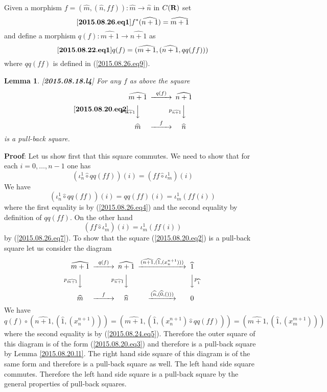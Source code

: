 \documentclass[11pt]{article}
\newenvironment{eq}{\begin{equation}}{\end{equation}}
\newenvironment{proof}{{\bf Proof}:}{\vskip 5mm }
\newtheorem{lemma}[proposition]{Lemma}
\newcommand{\llabel}[1]{\label{#1}[{\bf #1}]}
\newcommand{\sr}{\rightarrow}
\newcommand{\rr}{{\bf R}}
\newcommand{\wh}{\widehat}
\newcommand{\hc}{\wh{\circ}}
\begin{document}
%
Given a morphism $f=(\wh{m},(\wh{n},ff)):\wh{m}\sr \wh{n}$ in $C(\rr)$ set
%
\begin{eq}
\llabel{2015.08.26.eq1}
f^*(\wh{n+1})=\wh{m+1}
\end{eq}
%
and define a morphism $q(f):\wh{m+1}\sr \wh{n+1}$ as  
%
\begin{eq}
\llabel{2015.08.22.eq1}
q(f)=(\wh{m+1},(\wh{n+1},qq(ff)))
\end{eq}
% 
where $qq(ff)$ is defined in (\ref{2015.08.26.eq9}).
%
\begin{lemma}
\llabel{2015.08.18.l4}
For any $f$ as above the square
%
\begin{eq}\llabel{2015.08.20.eq2}
\begin{CD}
\wh{m+1} @>q(f)>> \wh{n+1}\\
@Vp_{\wh{m+1}}VV @Vp_{\wh{n+1}}VV\\
\wh{m} @>f>> \wh{n}
\end{CD}
\end{eq}
%
is a pull-back square.
\end{lemma}
%
\begin{proof}
Let us show first that this square commutes. We need to show that for each $i=0,\dots, n-1$ one has
%
$$(\iota_n^1\hc qq(ff))(i)=(ff\hc \iota_m^1)(i)$$
%
We have
%
$$(\iota_n^1\hc qq(ff))(i)=qq(ff)(i)=\iota_m^1(ff(i))$$
%
where the first equality is by (\ref{2015.08.26.eq4}) and the second equality by definition of $qq(ff)$. On the other hand
%
$$(ff\hc \iota_m^1)(i)=\iota_m^1(ff(i))$$
%
by (\ref{2015.08.26.eq7}).  To show that the square (\ref{2015.08.20.eq2}) is a pull-back square let us consider the diagram
%
$$
\begin{CD}
\wh{m+1} @>q(f)>> \wh{n+1} @>(\wh{n+1},(\wh{1},(x_n^{n+1})))>> \wh{1}\\
@Vp_{\wh{m+1}}VV @Vp_{\wh{n+1}}VV @VVp_{\wh{1}}V\\
\wh{m} @>f>> \wh{n} @>(\wh{n},(\wh{0},()))>> 0
\end{CD}
$$
%
We have
%
\begin{eq}\label{2015.08.20.eq4}
q(f)\circ (\wh{n+1},(\wh{1},(x_n^{n+1})))=(\wh{m+1},(\wh{1},(x_n^{n+1})\hc qq(ff)))=(\wh{m+1},(\wh{1},(x_m^{m+1})))
\end{eq}
%
where the second equality is by (\ref{2015.08.24.eq5}). Therefore the outer square of this diagram is of the form (\ref{2015.08.20.eq3}) and therefore is a pull-back square by Lemma \ref{2015.08.20.l1}. The right hand side square of this diagram is of the same form and therefore is a pull-back square as well. The left hand side square commutes. Therefore the left hand side square is a pull-back square by the general properties of pull-back squares.
\end{proof}
\end{document}
